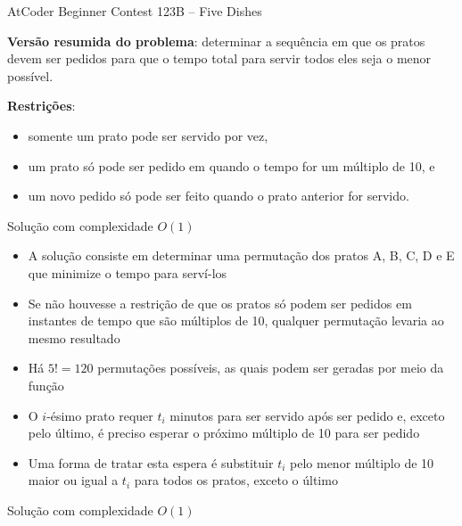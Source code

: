 \begin{frame}[fragile]{AtCoder Beginner Contest 123B -- Five Dishes}

    \textbf{Versão resumida do problema}: determinar a sequência em que os pratos devem ser
        pedidos para que o tempo total para servir todos eles seja o menor possível.

    \vspace{0.1in}
    \textbf{Restrições}:
    \begin{itemize}
        \item somente um prato pode ser servido por vez,
        \item um prato só pode ser pedido em quando o tempo for um múltiplo de 10, e
        \item um novo pedido só pode ser feito quando o prato anterior for servido.
    \end{itemize}
\end{frame}

\begin{frame}[fragile]{Solução com complexidade $O(1)$}

    \begin{itemize}
        \item A solução consiste em determinar uma permutação dos pratos A, B, C, D e E que 
            minimize o tempo para serví-los

        \item Se não houvesse a restrição de que os pratos só podem ser pedidos em instantes de
            tempo que são múltiplos de 10, qualquer permutação levaria ao mesmo resultado

        \item Há $5! = 120$ permutações possíveis, as quais podem ser geradas por meio da 
            função 

        \item O $i$-ésimo prato requer $t_i$ minutos para ser servido após ser pedido e, exceto
            pelo último, é preciso esperar o próximo múltiplo de 10 para ser pedido

        \item Uma forma de tratar esta espera é substituir $t_i$ pelo menor múltiplo de 10 maior
            ou igual a $t_i$ para todos os pratos, exceto o último
    \end{itemize}

\end{frame}

\begin{frame}[fragile]{Solução com complexidade $O(1)$}
\end{frame}

